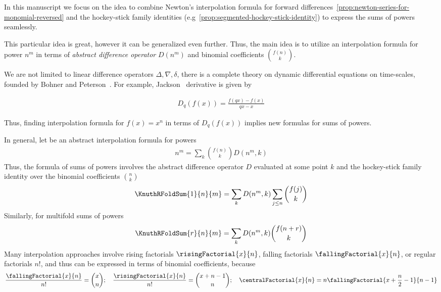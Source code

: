In this manuscript we focus on the idea to combine
Newton's interpolation formula for forward differences~\eqref{prop:newton-series-for-monomial-reversed}
and the hockey-stick family identities (e.g~\eqref{prop:segmented-hockey-stick-identity}) to express the sums of powers seamlessly.

This particular idea is great, however it can be generalized even further.
Thus, the main idea is to utilize an interpolation formula for power $n^m$ in terms of \textit{abstract difference operator} $D(n^m)$
and binomial coefficients $\binom{f(n)}{k}$.

We are not limited to linear difference operators $\Delta, \nabla, \delta$, there is a complete theory
on dynamic differential equations on time-scales, founded by Bohner and Peterson~\cite{Bohner2001DynamicEO}.
For example, Jackson~\cite{jackson_1909} derivative is given by

\begin{align*}
  D_q(f(x)) = \frac{f(qx) - f(x)}{qx-x}
\end{align*}

Thus, finding interpolation formula for $f(x)=x^n$ in terms of $D_q(f(x))$ implies new formulas for sums of powers.

In general, let be an abstract interpolation formula for powers
\begin{align*}
  n^m = \sum_{k} \binom{f(n)}{k} D(n^m, k)
\end{align*}
Thus, the formula of sums of powers involves the abstract difference operator $D$ evaluated at some point $k$ and the hockey-stick
family identity over the binomial coefficients $\binom{n}{k}$
\begin{align*}
  \KnuthRFoldSum{1}{n}{m} = \sum_{k} D(n^m, k) \sum_{j \leq n} \binom{f(j)}{k}
\end{align*}
Similarly, for multifold sums of powers
\begin{align*}
  \KnuthRFoldSum{r}{n}{m} = \sum_{k} D(n^m, k) \binom{f(n+r)}{k}
\end{align*}
Many interpolation approaches involve rising factorials $\risingFactorial{x}{n}$,
falling factorials $\fallingFactorial{x}{n}$, or regular factorials $n!$,
and thus can be expressed
in terms of binomial coefficients, because
\begin{align*}
  \frac{\fallingFactorial{x}{n}}{n!} = \binom{x}{n}; \quad
  \frac{\risingFactorial{x}{n}}{n!} = \binom{x+n-1}{n}; \quad
  \centralFactorial{x}{n} = n \fallingFactorial{x+\frac{n}{2}-1}{n-1}
\end{align*}

